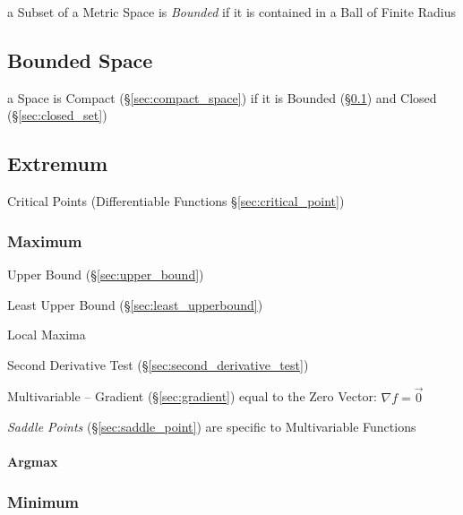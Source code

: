 a Subset of a Metric Space is \emph{Bounded} if it is contained in a Ball of
Finite Radius



\subsection{Bounded Space}\label{sec:bounded_space}

a Space is Compact (\S\ref{sec:compact_space}) if it is Bounded
(\S\ref{sec:bounded_space}) and Closed (\S\ref{sec:closed_set})



\subsection{Extremum}\label{sec:extremum}

\fist Critical Points (Differentiable Functions \S\ref{sec:critical_point})



\subsubsection{Maximum}\label{sec:maximum}

Upper Bound (\S\ref{sec:upper_bound})

Least Upper Bound (\S\ref{sec:least_upperbound})

Local Maxima

Second Derivative Test (\S\ref{sec:second_derivative_test})

Multivariable -- Gradient (\S\ref{sec:gradient}) equal to the Zero Vector:
$\nabla{f} = \vec{0}$

\fist \emph{Saddle Points} (\S\ref{sec:saddle_point}) are specific to
Multivariable Functions



\paragraph{Argmax}\label{sec:argmax}\hfill



\subsubsection{Minimum}\label{sec:minimum}

